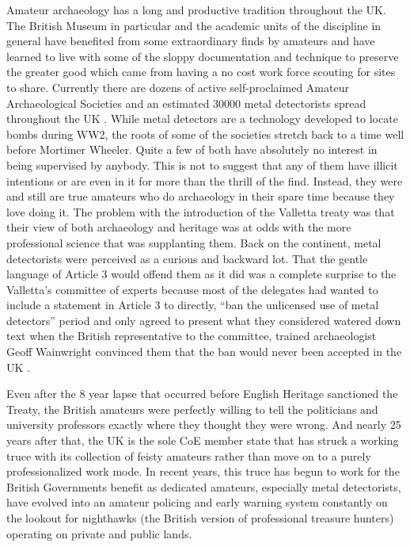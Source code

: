 Amateur archaeology has a long and productive tradition throughout the UK. The British Museum in particular and the academic units of the discipline in general have benefited from some extraordinary finds by amateurs and have learned to live with some of the sloppy documentation and technique to preserve the greater good which came from having a no cost work force scouting for sites to share. Currently there are dozens of active self-proclaimed Amateur Archaeological Societies and an estimated \num{30000} metal detectorists spread throughout the UK \parencites{Roeher_2006}{Potts_2015}. 
While metal detectors are a technology developed to locate bombs during WW2, the roots of some of the societies stretch back to a time well before Mortimer Wheeler. Quite a few of both have absolutely no interest in being supervised by anybody. This is not to suggest that any of them have illicit intentions or are even in it for more than the thrill of the find. Instead, they were and still are true amateurs who do archaeology in their spare time because they love doing it. The problem with the introduction of the Valletta treaty was that their view of both archaeology and heritage was at odds with the more professional science that was supplanting them. Back on the continent, metal detectorists were perceived as a curious and backward lot. That the gentle language of Article 3 would offend them as it did was a complete surprise to the Valletta’s committee of experts because most of the delegates had wanted to include a statement in Article 3 to directly, “ban the unlicensed use of metal detectors” period and only agreed to present what they considered watered down text when the British representative to the committee, trained archaeologist Geoff Wainwright convinced them that the ban would never been accepted in the UK \parencite[62]{Willems_2007}. 

Even after the 8 year lapse that occurred before English Heritage sanctioned the Treaty, the British amateurs were perfectly willing to tell the politicians and university professors exactly where they thought they were wrong. And nearly 25 years after that, the UK is the sole CoE member state that has struck a working truce with its collection of feisty amateurs rather than move on to a purely professionalized work mode. In recent years, this truce has begun to work for the British Governments benefit as dedicated amateurs, especially metal detectorists, have evolved into an amateur policing and early warning system constantly on the lookout for nighthawks (the British version of professional treasure hunters) operating on private and public lands. 

